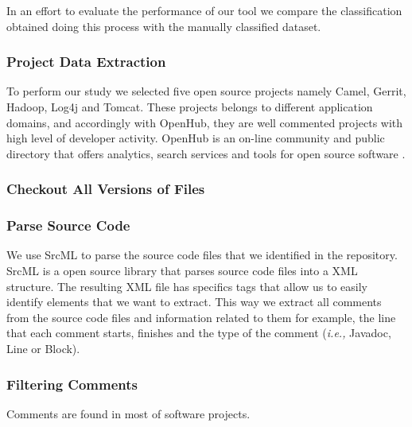 In an effort to evaluate the performance of our tool we compare the \SATD classification obtained doing this process with the manually classified dataset. 

\subsubsection*{Project Data Extraction}
\label{subsub:project_data_extraction}

To perform our study we selected five open source projects namely Camel, Gerrit, Hadoop, Log4j and Tomcat. These projects belongs to different application domains, and accordingly with OpenHub, they are well commented projects  with high level of developer activity. OpenHub is an on-line community and public directory that offers analytics, search services and tools for open source software \cite{Openhub:home}.

\subsubsection*{Checkout All Versions of Files}
\label{subsub:checkout_all_versions_of_files}

\subsubsection*{Parse Source Code}
\label{subsub:parse_source_code}

We use SrcML \cite{srcml} to parse the source code files that we identified in the repository. SrcML is a open source library that parses source code files into a XML structure. The resulting XML file has specifics tags that allow us to easily identify elements that we want to extract. This way we extract all comments from the source code files and information related to them for example, the line that each comment starts, finishes and the type of the comment (\textit{i.e.,} Javadoc, Line or Block).

\subsubsection*{Filtering Comments}
\label{subsub:filtering_comments}

Comments are found in most of software projects.

